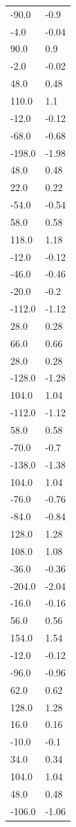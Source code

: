 \begin{longtable}{ll}
-90.0 & -0.9 \\
-4.0 & -0.04 \\
90.0 & 0.9 \\
-2.0 & -0.02 \\
48.0 & 0.48 \\
110.0 & 1.1 \\
-12.0 & -0.12 \\
-68.0 & -0.68 \\
-198.0 & -1.98 \\
48.0 & 0.48 \\
22.0 & 0.22 \\
-54.0 & -0.54 \\
58.0 & 0.58 \\
118.0 & 1.18 \\
-12.0 & -0.12 \\
-46.0 & -0.46 \\
-20.0 & -0.2 \\
-112.0 & -1.12 \\
28.0 & 0.28 \\
66.0 & 0.66 \\
28.0 & 0.28 \\
-128.0 & -1.28 \\
104.0 & 1.04 \\
-112.0 & -1.12 \\
58.0 & 0.58 \\
-70.0 & -0.7 \\
-138.0 & -1.38 \\
104.0 & 1.04 \\
-76.0 & -0.76 \\
-84.0 & -0.84 \\
128.0 & 1.28 \\
108.0 & 1.08 \\
-36.0 & -0.36 \\
-204.0 & -2.04 \\
-16.0 & -0.16 \\
56.0 & 0.56 \\
154.0 & 1.54 \\
-12.0 & -0.12 \\
-96.0 & -0.96 \\
62.0 & 0.62 \\
128.0 & 1.28 \\
16.0 & 0.16 \\
-10.0 & -0.1 \\
34.0 & 0.34 \\
104.0 & 1.04 \\
48.0 & 0.48 \\
-106.0 & -1.06 \\

\end{longtable}
